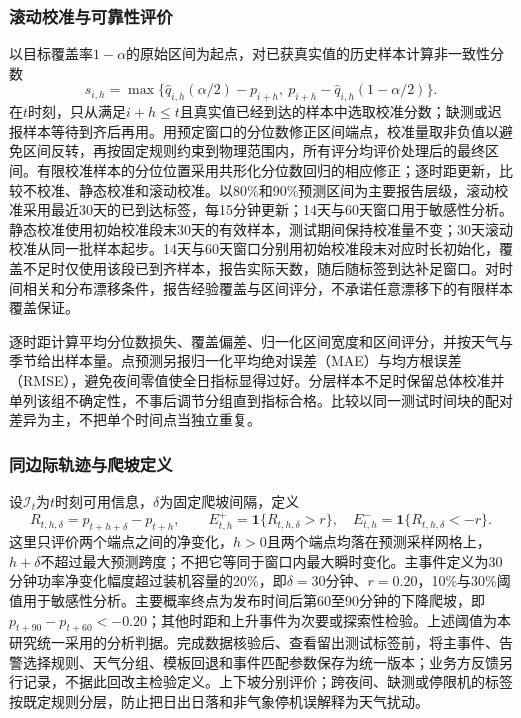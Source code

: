 \subsubsection{滚动校准与可靠性评价}
以目标覆盖率$1-\alpha$的原始区间为起点，对已获真实值的历史样本计算非一致性分数
\[
s_{i,h}=\max\{\widehat q_{i,h}(\alpha/2)-p_{i+h},\ p_{i+h}-\widehat q_{i,h}(1-\alpha/2)\}.
\]
在$t$时刻，只从满足$i+h\leq t$且真实值已经到达的样本中选取校准分数；缺测或迟报样本等待到齐后再用。用预定窗口的分位数修正区间端点，校准量取非负值以避免区间反转，再按固定规则约束到物理范围内，所有评分均评价处理后的最终区间。有限校准样本的分位位置采用共形化分位数回归的相应修正\cite{romano2019cqr}；逐时距更新，比较不校准、静态校准和滚动校准。以80\%和90\%预测区间为主要报告层级，滚动校准采用最近30天的已到达标签，每15分钟更新；14天与60天窗口用于敏感性分析。静态校准使用初始校准段末30天的有效样本，测试期间保持校准量不变；30天滚动校准从同一批样本起步。14天与60天窗口分别用初始校准段末对应时长初始化，覆盖不足时仅使用该段已到齐样本，报告实际天数，随后随标签到达补足窗口。对时间相关和分布漂移条件，报告经验覆盖与区间评分，不承诺任意漂移下的有限样本覆盖保证。

逐时距计算平均分位数损失、覆盖偏差、归一化区间宽度和区间评分，并按天气与季节给出样本量。点预测另报归一化平均绝对误差（MAE）与均方根误差（RMSE），避免夜间零值使全日指标显得过好。分层样本不足时保留总体校准并单列该组不确定性，不事后调节分组直到指标合格。比较以同一测试时间块的配对差异为主，不把单个时间点当独立重复。

\subsubsection{同边际轨迹与爬坡定义}
设$\mathcal I_t$为$t$时刻可用信息，$\delta$为固定爬坡间隔，定义
\[
R_{t,h,\delta}=p_{t+h+\delta}-p_{t+h},\qquad
E^+_{t,h}=\mathbf{1}\{R_{t,h,\delta}>r\},\quad
E^-_{t,h}=\mathbf{1}\{R_{t,h,\delta}<-r\}.
\]
这里只评价两个端点之间的净变化，$h>0$且两个端点均落在预测采样网格上，$h+\delta$不超过最大预测跨度；不把它等同于窗口内最大瞬时变化。主事件定义为30分钟功率净变化幅度超过装机容量的20\%，即$\delta=30$分钟、$r=0.20$，10\%与30\%阈值用于敏感性分析。主要概率终点为发布时间后第60至90分钟的下降爬坡，即$p_{t+90}-p_{t+60}<-0.20$；其他时距和上升事件为次要或探索性检验。上述阈值为本研究统一采用的分析判据。完成数据核验后、查看留出测试标签前，将主事件、告警选择规则、天气分组、模板回退和事件匹配参数保存为统一版本；业务方反馈另行记录，不据此回改主检验定义。上下坡分别评价；跨夜间、缺测或停限机的标签按既定规则分层，防止把日出日落和非气象停机误解释为天气扰动。

